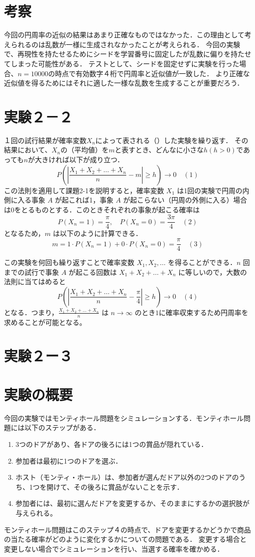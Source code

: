\documentclass[fleqn, a4paper. 12pt]{ltjsarticle} %
\begin{document}
\section*{考察}
今回の円周率の近似の結果はあまり正確なものではなかった．この理由として考えられるのは乱数が一様に生成されなかったことが考えられる．
今回の実験で、再現性を持たせるためにシードを学習番号に固定したが乱数に偏りを持たせてしまった可能性がある．
テストとして、シードを固定せずに実験を行った場合、$n = 10000$の時点で有効数字４桁で円周率と近似値が一致した．
より正確な近似値を得るためにはそれに適した一様な乱数を生成することが重要だろう．

\newpage
\section*{実験２－２}
１回の試行結果が確率変数$X_n$によって表される（）した実験を繰り返す．
その結果において、$X_n$の（平均値）を$m$と表すとき、どんなに小さな$h(h>0)$であっても$n$が大きければ以下が成り立つ．
\[
P\left(\left|\frac{X_1 + X_2 + \ldots + X_n}{n} - m\right| \geq h\right) \rightarrow 0 \quad (1)
\]
この法則を適用して課題2-1を説明すると，確率変数 $X_1$ は1回の実験で円周の内側に入る事象 $A$ が起これば1，事象 $A$ が起こらない（円周の外側に入る）場合は0をとるものとする．このときそれぞれの事象が起こる確率は
\[
P(X_n = 1) = \frac{\pi}{4}, \quad P(X_n = 0) = \frac{3\pi}{4}  \quad (2)
\]
となるため，$m$ は以下のように計算できる．
\[
m = 1 \cdot P(X_n = 1) + 0 \cdot P(X_n = 0) = \frac{\pi}{4} \quad (3)
\]

この実験を何回も繰り返すことで確率変数 $X_1, X_2, \ldots$ を得ることができる．$n$ 回までの試行で事象 $A$ が起こる回数は $X_1 + X_2 + \ldots + X_n$ に等しいので，大数の法則に当てはめると
\[
P\left(\left|\frac{X_1 + X_2 + \ldots + X_n}{n} - \frac{\pi}{4}\right| \geq h\right) \rightarrow 0 \quad (4)
\]
となる．つまり，$\frac{X_1 + X_2 + \ldots + X_n}{n}$ は $n \rightarrow \infty$ のとき$1$に確率収束するため円周率を求めることが可能となる。

\newpage
\section*{実験２ー３}
\section*{実験の概要}
今回の実験ではモンティホール問題をシミュレーションする．モンティホール問題には以下のステップがある．
\begin{enumerate}
  \item 3つのドアがあり、各ドアの後ろには1つの賞品が隠れている．
  \item 参加者は最初に1つのドアを選ぶ．
  \item ホスト（モンティ・ホール）は、参加者が選んだドア以外の2つのドアのうち、1つを開けて、その後ろに賞品がないことを示す．
  \item 参加者には、最初に選んだドアを変更するか、そのままにするかの選択肢が与えられる。
\end{enumerate}
モンティホール問題はこのステップ４の時点で、ドアを変更するかどうかで商品の当たる確率がどのように変化するかについての問題である．
変更する場合と変更しない場合でシミュレーションを行い、当選する確率を確かめる．
\end{document}
